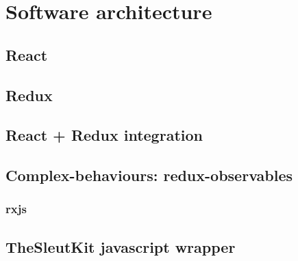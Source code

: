 \chapter{Software architecture}


\section{React}

\section{Redux}

\section{React + Redux integration}

\section{Complex-behaviours: redux-observables}

\subsection{rxjs}

\section{TheSleutKit javascript wrapper}

